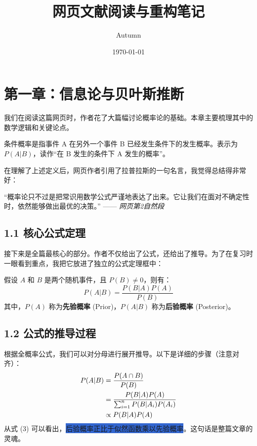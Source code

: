 \documentclass[UTF8, 11pt, a4paper]{ctexart}
\title{\vspace{-2cm}\color{OxfordBlue}\Huge\textbf{网页文献阅读与重构笔记}}
\author{Autumn}
\date{\today}
\newcommand{\hl}[1]{\colorbox{Highlight}{#1}} %
\newcommand{\imp}[1]{\textbf{\color{Burgundy}#1}} %
\begin{document}
\maketitle
\tableofcontents
\thispagestyle{empty}
\newpage

\section{第一章：信息论与贝叶斯推断}
我们在阅读这篇网页时，作者花了大篇幅讨论概率论的基础。本章主要梳理其中的数学逻辑和关键论点。

\begin{conceptbox}
条件概率是指事件 A 在另外一个事件 B 已经发生条件下的发生概率。表示为 $P(A|B)$，读作“在 B 发生的条件下 A 发生的概率”。
\end{conceptbox}

在理解了上述定义后，网页作者引用了拉普拉斯的一句名言，我觉得总结得非常好：

\begin{quotebox}
“概率论只不过是把常识用数学公式严谨地表达了出来。它让我们在面对不确定性时，依然能够做出最优的决策。” —— \textit{网页第2自然段}
\end{quotebox}

\subsection{1.1 核心公式定理}
接下来是全篇最核心的部分。作者不仅给出了公式，还给出了推导。为了在复习时一眼看到重点，我把它放进了独立的公式定理框中：

\begin{theorembox}
假设 $A$ 和 $B$ 是两个随机事件，且 $P(B) \neq 0$，则有：
\begin{equation}
    P(A|B) = \frac{P(B|A) P(A)}{P(B)}
\end{equation}
其中，$P(A)$ 称为\imp{先验概率} (Prior)，$P(A|B)$ 称为\imp{后验概率} (Posterior)。
\end{theorembox}

\subsection{1.2 公式的推导过程}
根据全概率公式，我们可以对分母进行展开推导。以下是详细的步骤（注意对齐）：
\begin{align}
    P(A|B) &= \frac{P(A \cap B)}{P(B)} \notag \\ %
           &= \frac{P(B|A) P(A)}{\sum_{i=1}^{n} P(B|A_i)P(A_i)} \\
           &\propto P(B|A) P(A)
\end{align}
从式 (3) 可以看出，\hl{后验概率正比于似然函数乘以先验概率}。这句话是整篇文章的灵魂。
\end{document}

